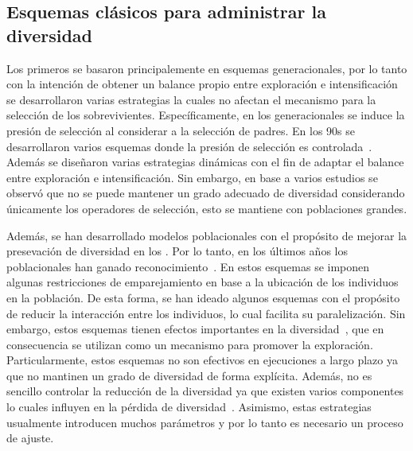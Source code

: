 \subsection{Esquemas clásicos para administrar la diversidad}

Los primeros \EAS{} se basaron principalemente en esquemas generacionales, por lo tanto con la intención de obtener un balance propio entre exploración e intensificación se desarrollaron varias estrategias la cuales no afectan el mecanismo para la selección de los sobrevivientes.
%
Específicamente, en los \EAS{} generacionales se induce la presión de selección al considerar a la selección de padres.
%
En los 90s se desarrollaron varios esquemas donde la presión de selección es controlada~\cite{eiben2003introduction}.
%
Además se diseñaron varias estrategias dinámicas con el fin de adaptar el balance entre exploración e intensificación.
%
Sin embargo, en base a varios estudios se observó que no se puede mantener un grado adecuado de diversidad considerando únicamente los operadores de selección, esto se mantiene con poblaciones grandes.
%

Además, se han desarrollado modelos poblacionales con el propósito de mejorar la presevación de diversidad en los \EAS{}.
%
Por lo tanto, en los últimos años los \EAS{} poblacionales han ganado reconocimiento~\cite{gao2014cluster}.
%
En estos esquemas se imponen algunas restricciones de emparejamiento en base a la ubicación de los individuos en la población.
%
De esta forma, se han ideado algunos esquemas con el propósito de reducir la interacción entre los individuos, lo cual facilita su paralelización.
%
Sin embargo, estos esquemas tienen efectos importantes en la diversidad~\cite{alba2005parallel}, que en consecuencia se utilizan como un mecanismo para promover la exploración.
%
Particularmente, estos esquemas no son efectivos en ejecuciones a largo plazo ya que no mantinen un grado de diversidad de forma explícita.
%
Además, no es sencillo controlar la reducción de la diversidad ya que existen varios componentes lo cuales influyen en la pérdida de diversidad~\cite{cantu2000efficient}.
%
Asimismo, estas estrategias usualmente introducen muchos parámetros y por lo tanto es necesario un proceso de ajuste.


